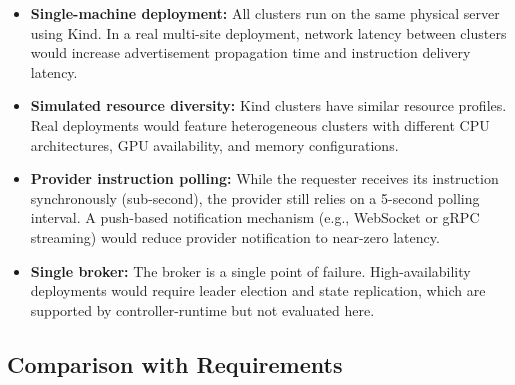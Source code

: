 \begin{itemize}
    \item \textbf{Single-machine deployment:} All clusters run on the same physical server using Kind. In a real multi-site deployment, network latency between clusters would increase advertisement propagation time and instruction delivery latency.

    \item \textbf{Simulated resource diversity:} Kind clusters have similar resource profiles. Real deployments would feature heterogeneous clusters with different CPU architectures, GPU availability, and memory configurations.

    \item \textbf{Provider instruction polling:} While the requester receives its instruction synchronously (sub-second), the provider still relies on a 5-second polling interval. A push-based notification mechanism (e.g., WebSocket or gRPC streaming) would reduce provider notification to near-zero latency.

    \item \textbf{Single broker:} The broker is a single point of failure. High-availability deployments would require leader election and state replication, which are supported by controller-runtime but not evaluated here.
\end{itemize}

\subsection{Comparison with Requirements}

